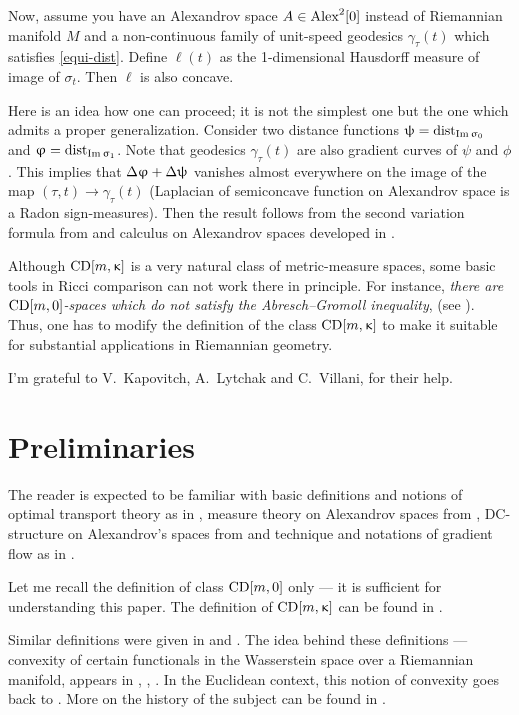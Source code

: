 \documentclass[oneside,a4paper]{article}
\begin{document}
Now, assume you have an Alexandrov space $A\in\CBB 20$ instead of Riemannian manifold $M$ and a non-continuous family of unit-speed geodesics $\gamma_\tau(t)$ which satisfies \ref{equi-dist}.
Define $\ell(t)$ as the 1-dimensional Hausdorff measure of image of $\sigma_t$.
Then  $\ell$ is also concave.

Here is an idea how one can proceed; 
it is not the simplest one but the one which admits a proper generalization.
Consider two distance functions $\uppsi=\mathop{\rm dist}\nolimits_{\mathop{\rm Im}\nolimits\upsigma_0}$ and $\upvarphi=\mathop{\rm dist}\nolimits_{\mathop{\rm Im}\nolimits\upsigma_1}$.
Note that geodesics $\gamma_\tau(t)$ are also gradient curves of $\psi$ and $\phi$.
This implies that $\Delta\upvarphi+\Delta\uppsi$ vanishes almost everywhere on the image of the map $(\tau,t)\to\gamma_\tau(t)$ (Laplacian of semiconcave function on Alexandrov space is a Radon sign-measures).
Then the result follows from the second variation formula from \cite{petrunin:parallel}
and calculus on Alexandrov spaces developed in \cite{perelman:DC}.



Although $\CD m \kappa$ is a very natural class of metric-measure spaces, 
some basic tools in Ricci comparison can not work there in principle.
For instance,
\emph{there are $\CD m 0$-spaces which do not satisfy the Abresch--Gromoll inequality}, (see \cite{AG}).
Thus, one has to modify the definition of the class $\CD m \kappa$
to make it suitable for substantial applications in Riemannian geometry.


\smallskip

I'm grateful to 
V.~Kapovitch,
A.~Lytchak 
and C.~Villani, 
for their help.

\section{Preliminaries}

The reader is expected to be familiar with 
basic definitions and notions of optimal transport  theory as in \cite{villani}, 
measure theory on Alexandrov spaces from \cite{BGP}, 
DC-structure on Alexandrov's spaces from \cite{perelman:DC} 
and technique and notations of gradient flow as in \cite{petrunin:survey}.


Let me recall the definition of class $\CD m0$ only --- it is sufficient for understanding this paper.
The definition of $\CD m\kappa$ can be found in \cite[29.8]{villani}.

Similar definitions were given in \cite{lott-villani} and \cite{sturm}.
The idea behind these definitions --- convexity of certain functionals in the Wasserstein space
over a Riemannian manifold, appears in \cite{otto-villani}, \cite{CMS}, \cite{SvR}.
In the Euclidean context, this notion of convexity goes back to \cite{McC}.
More on the history of the subject can be found in \cite{villani}.
\end{document}
